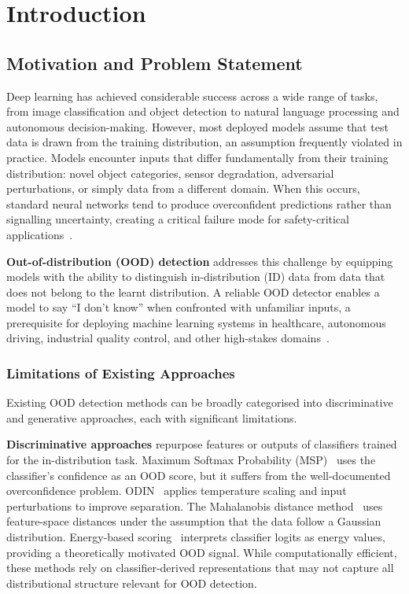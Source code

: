 \cleardoubleoddpage
\chapter{Introduction}
\label{chap:introduction}

\section{Motivation and Problem Statement}
\label{sec:intro:motivation}
\begingroup
\fontsize{11pt}{13.2pt}\selectfont

Deep learning has achieved considerable success across a wide range of tasks, from image classification and object detection to natural language processing and autonomous decision-making. However, most deployed models assume that test data is drawn from the training distribution, an assumption frequently violated in practice. Models encounter inputs that differ fundamentally from their training distribution: novel object categories, sensor degradation, adversarial perturbations, or simply data from a different domain. When this occurs, standard neural networks tend to produce overconfident predictions rather than signalling uncertainty, creating a critical failure mode for safety-critical applications~\cite{hendrycks2017baseline, guo2017calibration}.

\textbf{Out-of-distribution (OOD) detection} addresses this challenge by equipping models with the ability to distinguish in-distribution (ID) data from data that does not belong to the learnt distribution. A reliable OOD detector enables a model to say ``I don't know'' when confronted with unfamiliar inputs, a prerequisite for deploying machine learning systems in healthcare, autonomous driving, industrial quality control, and other high-stakes domains~\cite{yang2021generalized}.

\subsection{Limitations of Existing Approaches}
\label{sec:intro:limitations}

Existing OOD detection methods can be broadly categorised into discriminative and generative approaches, each with significant limitations.

\textbf{Discriminative approaches} repurpose features or outputs of classifiers trained for the in-distribution task. Maximum Softmax Probability (MSP)~\cite{hendrycks2017baseline}
uses the classifier's confidence as an OOD score, but it suffers from the well-documented overconfidence problem. ODIN~\cite{liang2018enhancing} applies temperature scaling and input perturbations to improve separation. The Mahalanobis distance method~\cite{lee2018simple} uses feature-space distances under the assumption that the data follow a Gaussian distribution. Energy-based scoring~\cite{liu2020energy} interprets classifier logits as energy values, providing a theoretically motivated OOD signal. While computationally efficient, these methods rely on classifier-derived representations that may not capture all distributional structure relevant for OOD detection.

